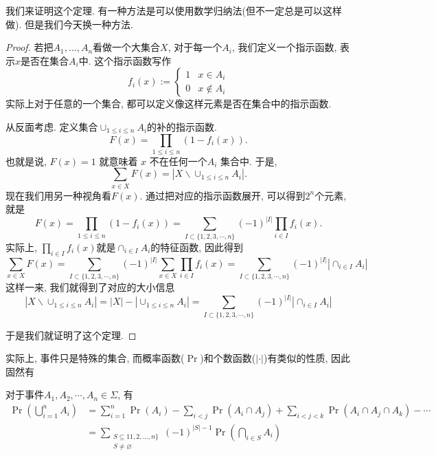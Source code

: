 \documentclass{ctexart}
\begin{document}
我们来证明这个定理. 有一种方法是可以使用数学归纳法(但不一定总是可以这样做). 但是我们今天换一种方法. 

\begin{proof}
    若把$A_1, ..., A_n$看做一个大集合$X$, 对于每一个$A_i$, 我们定义一个指示函数, 表示$x$是否在集合$A_i$中. 这个指示函数写作 
    $$
    f_{i}(x):=\begin{cases}
1 & x\in A_{i}\\
0 & x\notin A_{i}
\end{cases}
$$
实际上对于任意的一个集合, 都可以定义像这样元素是否在集合中的指示函数. 

从反面考虑. 定义集合$\cup_{1 \leq i \leq n} A_i$的补的指示函数. 
$$
F(x)=\prod_{1 \leq i \leq n}\left(1-f_i(x)\right) .
$$
也就是说, $F(x)=1$ 就意味着 $x$ 不在任何一个$A_i$ 集合中. 于是, 
$$
\sum_{x \in X} F(x)=\left|X \backslash \cup_{1 \leq i \leq n} A_i\right| .
$$
现在我们用另一种视角看$F(x)$. 通过把对应的指示函数展开, 可以得到$2^n$个元素, 就是
$$
F(x)=\prod_{1 \leq i \leq n}\left(1-f_i(x)\right)=\sum_{I \subset\{1,2,3,\cdots, n\}}(-1)^{|I|} \prod_{i \in I} f_i(x) .
$$
实际上, $\prod_{i \in I} f_i(x)$就是$\cap_{i \in I} A_i$的特征函数, 因此得到
$$
\sum_{x \in X} F(x)=\sum_{I \subset\{1,2,3,\cdots, n\}}(-1)^{|I|} \sum_{x \in X} \prod_{i \in I} f_i(x)=\sum_{I \subset\{1,2,3,\cdots, n\}}(-1)^{|I|}\left|\cap_{i \in I} A_i\right|
$$
这样一来, 我们就得到了对应的大小信息
$$\left|X \backslash \cup_{1 \leq i \leq n} A_i\right|=|X|-\left|\cup_{1 \leq i \leq n} A_i\right|=\sum_{I \subset\{1,2,3,\cdots, n\}}(-1)^{|I|}\left|\cap_{i \in I} A_i\right|$$

于是我们就证明了这个定理. 

\end{proof}

实际上, 事件只是特殊的集合, 而概率函数($\Pr$)和个数函数($|\cdot|$)有类似的性质, 因此固然有

对于事件$A_1, A_2, \cdots, A_n \in \Sigma$, 有
$$\begin{aligned} \operatorname{Pr}\left(\bigcup_{i=1}^n A_i\right) & =\sum_{i=1}^n \operatorname{Pr}\left(A_i\right)-\sum_{i<j} \operatorname{Pr}\left(A_i \cap A_j\right)+\sum_{i<j<k} \operatorname{Pr}\left(A_i \cap A_j \cap A_k\right)-\cdots \\ & =\sum_{\substack{S \subseteq 11,2, \ldots, n\} \\ S \neq \varnothing}}(-1)^{|S|-1} \operatorname{Pr}\left(\bigcap_{i \in S} A_i\right)\end{aligned}$$
\end{document}
